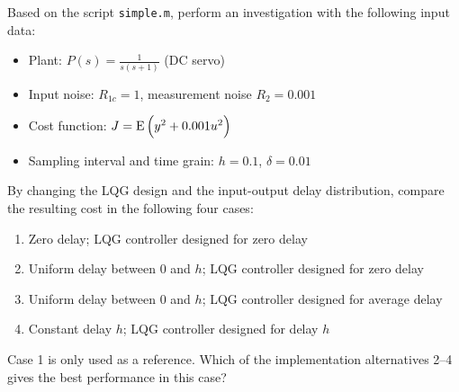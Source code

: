 \documentclass[final,twoside]{rapport}  %
\DeclareMathOperator{\E}{E\,}
\begin{document}
Based on the script \texttt{simple.m}, perform an investigation with
the following input data:

\begin{itemize}
\item Plant: $P(s) = \frac{1}{s(s+1)}$ (DC servo)
\item Input noise: $R_{1c} = 1$, measurement noise $R_2 = 0.001$
\item Cost function: $J = \E \Bigl( y^2 + 0.001 u^2 \Bigr)$
\item Sampling interval and time grain: $h = 0.1$, $\delta = 0.01$
\end{itemize}

By changing the LQG design and the input-output delay distribution,
compare the resulting cost in the following four cases:
\begin{enumerate}
\item Zero delay; LQG controller designed for zero delay
\item Uniform delay between 0 and $h$; LQG controller designed for zero delay
\item Uniform delay between 0 and $h$; LQG controller designed for
  average delay 
\item Constant delay $h$; LQG controller designed for delay $h$
\end{enumerate}
Case 1 is only used as a reference. Which of the implementation
alternatives  2--4 gives the best performance in this case?
\end{document}
